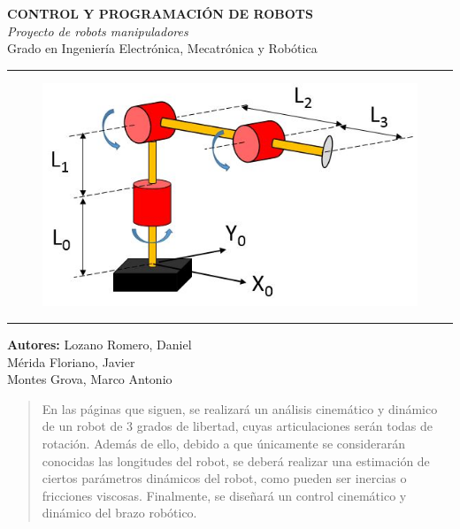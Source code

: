 \documentclass[a4paper,twoside]{article}
\begin{document}
\begin{titlepage}
	\centering
\Huge{\textbf{CONTROL Y PROGRAMACIÓN DE ROBOTS}} \\
\Huge{\textit{Proyecto de robots manipuladores}}\\

\vspace{1cm}
\LARGE{Grado en Ingeniería Electrónica, Mecatrónica y Robótica}\\
\rule{\textwidth}{0.1mm}
\begin{figure}[h!]
	\centering
	\includegraphics[width=1\textwidth]{brazo_portada}
\end{figure}
\vspace{3cm}
\rule{\textwidth}{0.1mm}
\Large{\textbf{Autores:} Lozano Romero, Daniel\\
 Mérida Floriano, Javier\\
 Montes Grova, Marco Antonio}
\end{titlepage}
\tableofcontents
\newpage
\begin{abstract}
	En las páginas que siguen, se realizará un análisis cinemático y dinámico de un robot de 3 grados de libertad, cuyas articulaciones serán todas de rotación. Además de ello, debido a que únicamente se considerarán conocidas las longitudes del robot, se deberá realizar una estimación de ciertos parámetros dinámicos del robot, como pueden ser inercias o fricciones viscosas. Finalmente, se diseñará un control cinemático y dinámico del brazo robótico.\\
\end{abstract}
\end{document}
